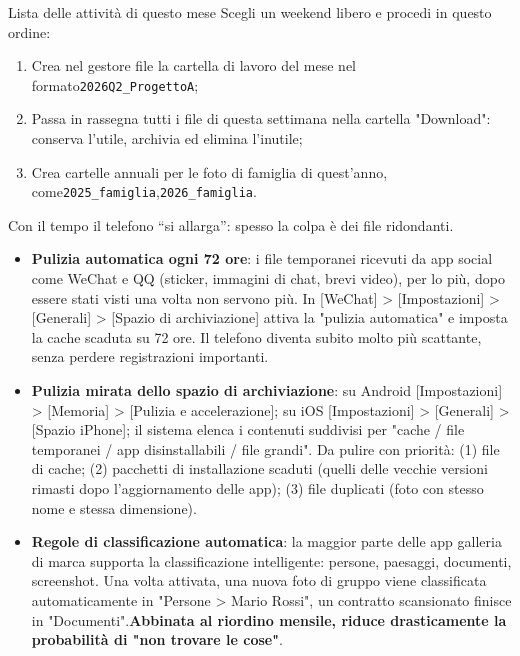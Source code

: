 \begin{tcbpractice}{Lista delle attività di questo mese}
Scegli un weekend libero e procedi in questo ordine:

\begin{enumerate}
  \item Crea nel gestore file la cartella di lavoro del mese nel formato\texttt{2026Q2\_ProgettoA};
  \item Passa in rassegna tutti i file di questa settimana nella cartella "Download": conserva l'utile, archivia ed elimina l'inutile;
  \item Crea cartelle annuali per le foto di famiglia di quest'anno, come\texttt{2025\_famiglia},\texttt{2026\_famiglia}.
\end{enumerate}

\end{tcbpractice}


Con il tempo il telefono “si allarga”: spesso la colpa è dei file ridondanti.

\begin{itemize}
  \item \textbf{Pulizia automatica ogni 72 ore}: i file temporanei ricevuti da app social come WeChat e QQ (sticker, immagini di chat, brevi video), per lo più, dopo essere stati visti una volta non servono più. In [WeChat] > [Impostazioni] > [Generali] > [Spazio di archiviazione] attiva la "pulizia automatica" e imposta la cache scaduta su 72 ore. Il telefono diventa subito molto più scattante, senza perdere registrazioni importanti.
  \item \textbf{Pulizia mirata dello spazio di archiviazione}: su Android [Impostazioni] > [Memoria] > [Pulizia e accelerazione]; su iOS [Impostazioni] > [Generali] > [Spazio iPhone]; il sistema elenca i contenuti suddivisi per "cache / file temporanei / app disinstallabili / file grandi". Da pulire con priorità: (1) file di cache; (2) pacchetti di installazione scaduti (quelli delle vecchie versioni rimasti dopo l'aggiornamento delle app); (3) file duplicati (foto con stesso nome e stessa dimensione).
  \item \textbf{Regole di classificazione automatica}: la maggior parte delle app galleria di marca supporta la classificazione intelligente: persone, paesaggi, documenti, screenshot. Una volta attivata, una nuova foto di gruppo viene classificata automaticamente in "Persone > Mario Rossi", un contratto scansionato finisce in "Documenti".\textbf{Abbinata al riordino mensile, riduce drasticamente la probabilità di "non trovare le cose"}.
\end{itemize}

